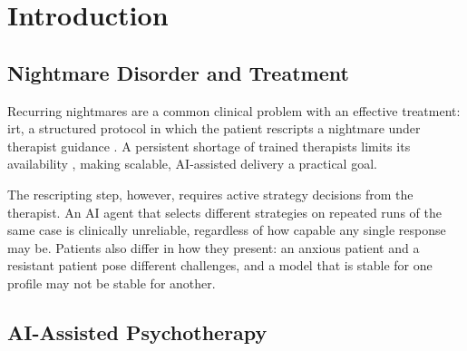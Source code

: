 \chapter{Introduction}
\label{chap:introduction}

\section{Nightmare Disorder and Treatment}
\label{sec:intro-irt}
Recurring nightmares are a common clinical problem with an effective
treatment: \gls{irt}, a structured protocol in which the patient rescripts
a nightmare under therapist guidance \autocite{FGA5H3ZD}. A persistent
shortage of trained therapists limits its availability
\autocite{7M7NHYXT}, making scalable, AI-assisted delivery a practical
goal.

The rescripting step, however, requires active strategy decisions
from the therapist. An AI agent that selects different strategies on
repeated runs of the same case is clinically unreliable, regardless of
how capable any single response may be. Patients also differ in how they
present: an anxious patient and a resistant patient pose different
challenges, and a model that is stable for one profile may not be stable
for another.


\section{AI-Assisted Psychotherapy}
\label{sec:intro-ai-therapy}

